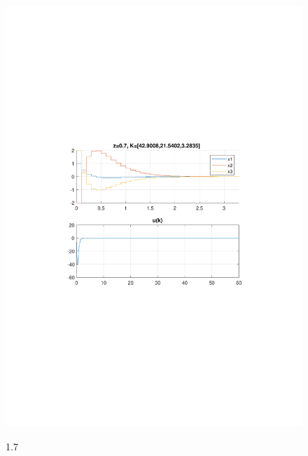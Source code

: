 \documentclass{article}
\begin{document}
{\begin{figure}[H]
\includegraphics[clip, trim=0.5cm 9.5cm 0.5cm 9.5cm, width=1.00\textwidth]{../rys/zad3_rys7.pdf}
\label{fig:rys3.1.7}
\caption{1.7}
\end{figure}
}
\end{document}
